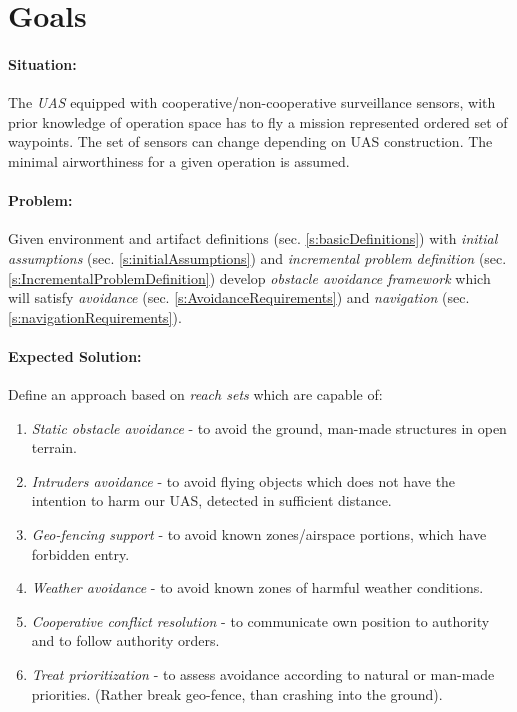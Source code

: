 \section{Goals}\label{s:goals}
\paragraph{Situation:} The \emph{UAS} equipped with cooperative/non-cooperative surveillance sensors, with prior knowledge of operation space has to fly a mission represented ordered set of waypoints. The set of sensors can change depending on UAS construction. The minimal airworthiness for a given operation is assumed.

\paragraph{Problem:} Given environment and artifact definitions (sec. \ref{s:basicDefinitions}) with \emph{initial assumptions} (sec. \ref{s:initialAssumptions}) and \emph{incremental problem definition} (sec. \ref{s:IncrementalProblemDefinition}) develop \emph{obstacle avoidance framework} which will satisfy \emph{avoidance} (sec. \ref{s:AvoidanceRequirements}) and \emph{navigation} (sec. \ref{s:navigationRequirements}).

\paragraph{Expected Solution:} Define an approach based on \emph{reach sets} which are capable of:

\begin{enumerate}
    \item \emph{Static obstacle avoidance} - to avoid the ground, man-made structures in open terrain. 
    
    \item \emph{Intruders avoidance} - to avoid flying objects which does not have the intention to harm our UAS, detected in sufficient distance. 

    \item \emph{Geo-fencing support} - to avoid known zones/airspace portions, which have forbidden entry.

    \item \emph{Weather avoidance} - to avoid known zones of harmful weather conditions.

    \item \emph{Cooperative conflict resolution} - to communicate own position to authority and to follow authority orders.
    
    \item \emph{Treat prioritization} - to assess avoidance according to natural or man-made priorities. (Rather break geo-fence, than crashing into the ground).
\end{enumerate}

